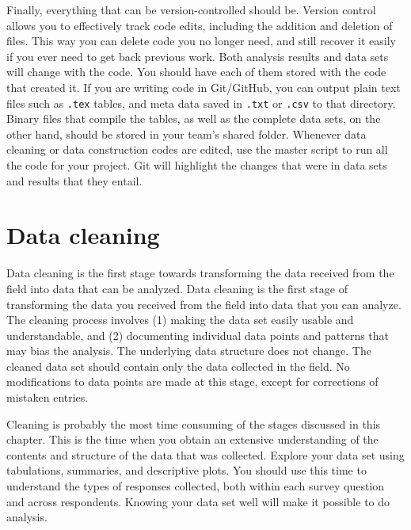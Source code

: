 Finally, everything that can be version-controlled should be. 
Version control allows you to effectively track code edits,
including the addition and deletion of files. 
This way you can delete code you no longer need, 
and still recover it easily if you ever need to get back previous work.
Both analysis results and data sets will change with the code.
You should have each of them stored with the code that created it.
If you are writing code in Git/GitHub,
you can output plain text files such as \texttt{.tex} tables,
and meta data saved in \texttt{.txt} or \texttt{.csv} to that directory.
Binary files that compile the tables,
as well as the complete data sets, on the other hand,
should be stored in your team's shared folder. 
Whenever data cleaning or data construction codes are edited,
use the master script to run all the code for your project.
Git will highlight the changes that were in data sets and results that they entail. 


\section{Data cleaning}

Data cleaning is the first stage towards transforming 
the data received from the field into data that can be analyzed.
Data cleaning is the first stage of transforming the data you received from the field into data that you can analyze.
The cleaning process involves (1) making the data set easily usable and understandable, and (2) documenting individual data points and patterns that may bias the analysis.
The underlying data structure does not change.
The cleaned data set should contain only the data collected in the field.
No modifications to data points are made at this stage, except for corrections of mistaken entries.

Cleaning is probably the most time consuming of the stages discussed in this chapter.
This is the time when you obtain an extensive understanding of  the contents and structure of the data that was collected.
Explore your data set using tabulations, summaries, and descriptive plots.
You should use this time to understand the types of responses collected, both within each survey question and across respondents.
Knowing your data set well will make it possible to do analysis.



